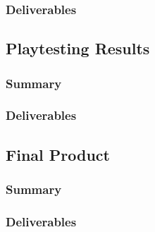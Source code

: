 \subsubsection{Deliverables}

\subsection{Playtesting Results}
\subsubsection{Summary}
\subsubsection{Deliverables}

\subsection{Final Product}
\subsubsection{Summary}
\subsubsection{Deliverables}
